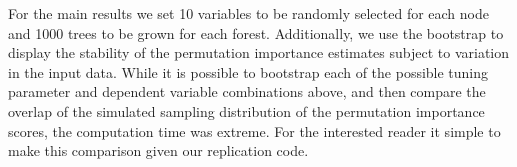 \documentclass[11pt]{article}
\begin{document}
For the main results we set 10 variables to be randomly selected for each node and 1000 trees to be grown for each forest. Additionally, we use the bootstrap to display the stability of the permutation importance estimates subject to variation in the input data. While it is possible to bootstrap each of the possible tuning parameter and dependent variable combinations above, and then compare the overlap of the simulated sampling distribution of the permutation importance scores, the computation time was extreme. For the interested reader it simple to make this comparison given our replication code.
\end{document}

